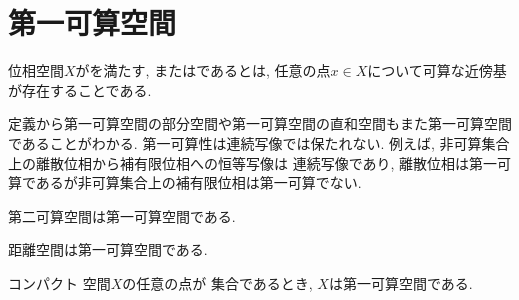 \documentclass[uplatex, dvipdfmx, a4paper, 12pt, class=jsbook, crop=false]{standalone}
\begin{document}
\section{第一可算空間}
\label{sec:first-countable-spaces}

\begin{definition}
	位相空間$ X $がを満たす,
	またはであるとは,
	任意の点$ x \in X $について可算な近傍基が存在することである.
\end{definition}

定義から第一可算空間の部分空間や第一可算空間の直和空間もまた第一可算空間であることがわかる.
第一可算性は連続写像では保たれない. 例えば, 非可算集合上の離散位相から補有限位相への恒等写像は
連続写像であり, 離散位相は第一可算であるが非可算集合上の補有限位相は第一可算でない.


\begin{proposition}
	第二可算空間は第一可算空間である.
\end{proposition}

\begin{proposition}
	距離空間は第一可算空間である.
\end{proposition}

\begin{proposition}
	コンパクト \Hausdorff 空間$ X $の任意の点が \Gdelta 集合であるとき,
	$ X $は第一可算空間である.
\end{proposition}
\end{document}

